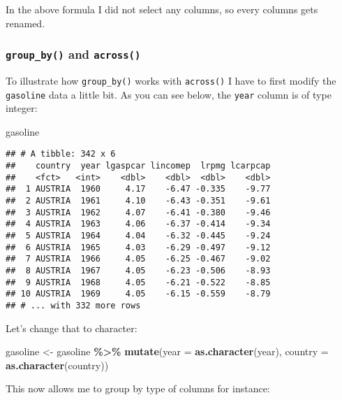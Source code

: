 \documentclass[
]{article}
\newenvironment{Shaded}{\begin{snugshade}}{\end{snugshade}}
\newcommand{\DataTypeTok}[1]{\textcolor[rgb]{0.13,0.29,0.53}{#1}}
\newcommand{\KeywordTok}[1]{\textcolor[rgb]{0.13,0.29,0.53}{\textbf{#1}}}
\newcommand{\NormalTok}[1]{#1}
\newcommand{\OperatorTok}[1]{\textcolor[rgb]{0.81,0.36,0.00}{\textbf{#1}}}
\newcommand{\StringTok}[1]{\textcolor[rgb]{0.31,0.60,0.02}{#1}}
\begin{document}
In the above formula I did not select any columns, so every columns gets renamed.

\hypertarget{group_by-and-across}{%
\subsubsection{\texorpdfstring{\texttt{group\_by()} and \texttt{across()}}{group\_by() and across()}}\label{group_by-and-across}}

To illustrate how \texttt{group\_by()} works with \texttt{across()} I have to first modify the
\texttt{gasoline} data a little bit. As you can see below, the \texttt{year} column is of type integer:

\begin{Shaded}
\begin{Highlighting}[]
\NormalTok{gasoline}
\end{Highlighting}
\end{Shaded}

\begin{verbatim}
## # A tibble: 342 x 6
##    country  year lgaspcar lincomep  lrpmg lcarpcap
##    <fct>   <int>    <dbl>    <dbl>  <dbl>    <dbl>
##  1 AUSTRIA  1960     4.17    -6.47 -0.335    -9.77
##  2 AUSTRIA  1961     4.10    -6.43 -0.351    -9.61
##  3 AUSTRIA  1962     4.07    -6.41 -0.380    -9.46
##  4 AUSTRIA  1963     4.06    -6.37 -0.414    -9.34
##  5 AUSTRIA  1964     4.04    -6.32 -0.445    -9.24
##  6 AUSTRIA  1965     4.03    -6.29 -0.497    -9.12
##  7 AUSTRIA  1966     4.05    -6.25 -0.467    -9.02
##  8 AUSTRIA  1967     4.05    -6.23 -0.506    -8.93
##  9 AUSTRIA  1968     4.05    -6.21 -0.522    -8.85
## 10 AUSTRIA  1969     4.05    -6.15 -0.559    -8.79
## # ... with 332 more rows
\end{verbatim}

Let's change that to character:

\begin{Shaded}
\begin{Highlighting}[]
\NormalTok{gasoline \textless{}{-}}\StringTok{ }\NormalTok{gasoline }\OperatorTok{\%\textgreater{}\%}
\StringTok{  }\KeywordTok{mutate}\NormalTok{(}\DataTypeTok{year =} \KeywordTok{as.character}\NormalTok{(year),}
         \DataTypeTok{country =} \KeywordTok{as.character}\NormalTok{(country))}
\end{Highlighting}
\end{Shaded}

This now allows me to group by type of columns for instance:
\end{document}
